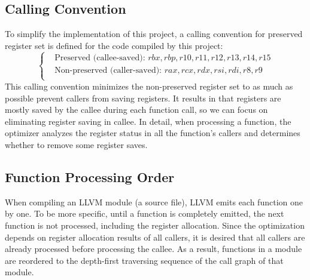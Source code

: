 \documentclass[acmsmall]{acmart}
\begin{document}
\subsection{Calling Convention}
\label{subsec:call-convention}
To simplify the implementation of this project, a calling convention for preserved register set is defined for the code compiled by this project:
\[
\begin{cases}
	& \text{Preserved (callee-saved): } rbx, rbp, r10, r11, r12, r13, r14, r15 \\
	& \text{Non-preserved (caller-saved): } rax, rcx, rdx, rsi, rdi, r8, r9 \\
\end{cases}
\]
This calling convention minimizes the non-preserved register set to as much as possible prevent callers from saving registers. It results in that registers are mostly saved by the callee during each function call, so we can focus on eliminating register saving in callee. In detail, when processing a function, the optimizer analyzes the register status in all the function's callers and determines whether to remove some register saves.

\subsection{Function Processing Order}
\label{subsec:reorder}
When compiling an LLVM module (a source file), LLVM emits each function one by one. To be more specific, until a function is completely emitted, the next function is not processed, including the register allocation. Since the optimization depends on register allocation results of all callers, it is desired that all callers are already processed before processing the callee. As a result, functions in a module are reordered to the depth-first traversing sequence of the call graph of that module.
\end{document}
